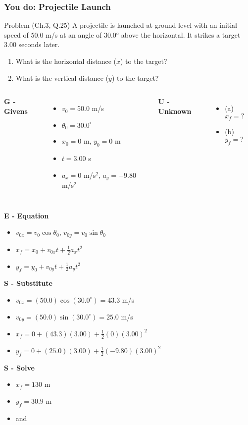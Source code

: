 \documentclass{beamer}
\begin{document}
\begin{frame}
\frametitle{You do: Projectile Launch}
\begin{block}{Problem (Ch.3, Q.25)}
A projectile is launched at ground level with an initial speed of 50.0 m/s at an angle of 30.0° above the horizontal. It strikes a target 3.00 seconds later.
\begin{enumerate}
    \item What is the horizontal distance ($x$) to the target?
    \item What is the vertical distance ($y$) to the target?
\end{enumerate}
\end{block}

\begin{columns}[T]
\textbf{G - Givens}
\begin{itemize}
\item $v_0 = 50.0$ m/s
\item $\theta_0 = 30.0^\circ$
\item $x_0 = 0$ m, $y_0 = 0$ m
\item $t = 3.00$ s
\item $a_x = 0$ m/s$^2$, $a_y = -9.80$ m/s$^2$
\end{itemize}

\textbf{U - Unknown}
\begin{itemize}
\item (a) $x_f = ?$
\item (b) $y_f = ?$
\end{itemize}
\end{columns}

\textbf{E - Equation}
\begin{itemize}
\item $v_{0x} = v_0 \cos\theta_0$, $v_{0y} = v_0 \sin\theta_0$
\item $x_f = x_0 + v_{0x}t + \frac{1}{2}a_x t^2$
\item $y_f = y_0 + v_{0y}t + \frac{1}{2}a_y t^2$
\end{itemize}

\textbf{S - Substitute}
\begin{itemize}
\item $v_{0x} = (50.0)\cos(30.0^\circ) = 43.3$ m/s
\item $v_{0y} = (50.0)\sin(30.0^\circ) = 25.0$ m/s
\item $x_f = 0 + (43.3)(3.00) + \frac{1}{2}(0)(3.00)^2$
\item $y_f = 0 + (25.0)(3.00) + \frac{1}{2}(-9.80)(3.00)^2$
\end{itemize}

\textbf{S - Solve}
\begin{itemize}
\item $x_f = 130$ m
\item $y_f = 30.9$ m
\item {} and 
\end{itemize}
\end{frame}
\end{document}
